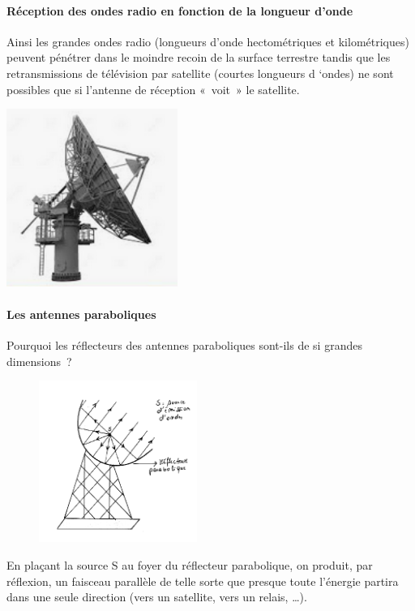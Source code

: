 \paragraph{Réception des ondes radio en fonction de la longueur d'onde}

Ainsi les grandes ondes radio (longueurs d'onde hectométriques et
kilométriques) peuvent pénétrer dans le moindre recoin de la surface
terrestre tandis que les retransmissions de télévision par satellite
(courtes longueurs d `ondes) ne sont possibles que si l'antenne de
réception «~voit~» le satellite.

\includegraphics[width=5.586cm,height=5.808cm]{Pictures/100000010000009E000000A4B38E4E23C937303B.png}
\paragraph{Les antennes paraboliques}

Pourquoi les réflecteurs des antennes paraboliques sont-ils de si
grandes dimensions~?

\begin{figure}
\centering
\includegraphics[width=5.166cm,height=5.269cm]{Pictures/10000001000001920000019ACA6FE085C34366DF.png}
\caption{}
\end{figure}

En plaçant la source S au foyer du réflecteur parabolique, on produit,
par réflexion, un faisceau parallèle de telle sorte que presque toute
l'énergie partira dans une seule direction (vers un satellite, vers un
relais, \ldots).

